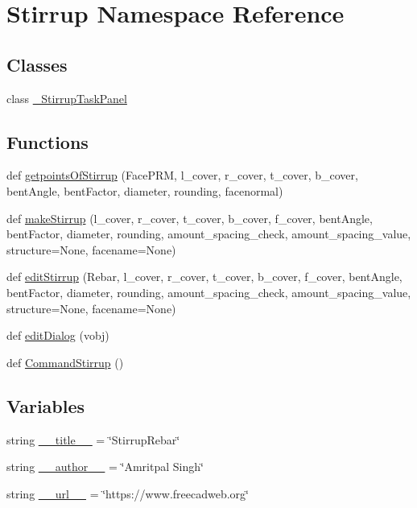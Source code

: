 \hypertarget{namespaceStirrup}{}\section{Stirrup Namespace Reference}
\label{namespaceStirrup}
\subsection*{Classes}
\begin{DoxyCompactItemize}
\item 
class \hyperlink{classStirrup_1_1__StirrupTaskPanel}{\+\_\+\+Stirrup\+Task\+Panel}
\end{DoxyCompactItemize}
\subsection*{Functions}
\begin{DoxyCompactItemize}
\item 
def \hyperlink{namespaceStirrup_aa6df5118806bfe9d3a799e1bf549bb0a}{getpoints\+Of\+Stirrup} (Face\+P\+RM, l\+\_\+cover, r\+\_\+cover, t\+\_\+cover, b\+\_\+cover, bent\+Angle, bent\+Factor, diameter, rounding, facenormal)
\item 
def \hyperlink{namespaceStirrup_a705fc121e2af9c8ac05eb299f4fb9f2f}{make\+Stirrup} (l\+\_\+cover, r\+\_\+cover, t\+\_\+cover, b\+\_\+cover, f\+\_\+cover, bent\+Angle, bent\+Factor, diameter, rounding, amount\+\_\+spacing\+\_\+check, amount\+\_\+spacing\+\_\+value, structure=None, facename=None)
\item 
def \hyperlink{namespaceStirrup_a1f6d278ace7fe116895dba342e2a3573}{edit\+Stirrup} (Rebar, l\+\_\+cover, r\+\_\+cover, t\+\_\+cover, b\+\_\+cover, f\+\_\+cover, bent\+Angle, bent\+Factor, diameter, rounding, amount\+\_\+spacing\+\_\+check, amount\+\_\+spacing\+\_\+value, structure=None, facename=None)
\item 
def \hyperlink{namespaceStirrup_a8ebd17322b7f4f5fe9e50bd578ba670d}{edit\+Dialog} (vobj)
\item 
def \hyperlink{namespaceStirrup_a3863ce61c716794557101a50f41597b5}{Command\+Stirrup} ()
\end{DoxyCompactItemize}
\subsection*{Variables}
\begin{DoxyCompactItemize}
\item 
string \hyperlink{namespaceStirrup_aac4f16b6285f67fb07673ac264bac3dc}{\+\_\+\+\_\+title\+\_\+\+\_\+} = \char`\"{}Stirrup\+Rebar\char`\"{}
\item 
string \hyperlink{namespaceStirrup_ad470a52dca49f918ddfef810e749291c}{\+\_\+\+\_\+author\+\_\+\+\_\+} = \char`\"{}Amritpal Singh\char`\"{}
\item 
string \hyperlink{namespaceStirrup_a3b5b07aa3d0183155a2be24e2d0d4a82}{\+\_\+\+\_\+url\+\_\+\+\_\+} = \char`\"{}https\+://www.\+freecadweb.\+org\char`\"{}
\end{DoxyCompactItemize}


